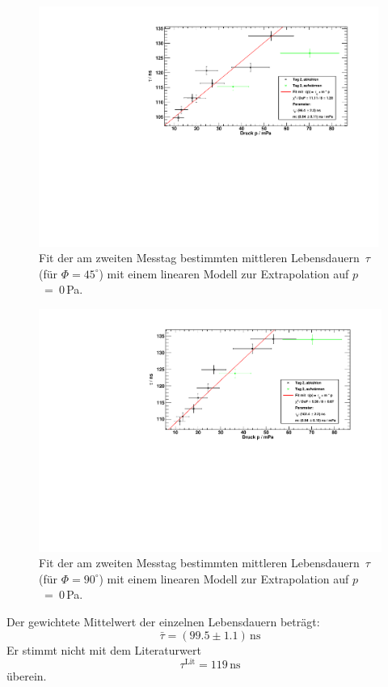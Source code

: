 \begin{figure}[H]
\begin{center}
  \includegraphics[width=0.99\textwidth]{../img/taus_45_day2.pdf}
  \caption{Fit der am zweiten Messtag bestimmten mittleren Lebensdauern~$\tau$ (für $\Phi=45^\circ$) mit einem linearen Modell
  zur Extrapolation auf \mbox{$p$ = 0\,Pa}.}
  \label{img:taus:day2:45}
\end{center}
\end{figure}

\begin{figure}[H]
\begin{center}
  \includegraphics[width=\textwidth]{../img/taus_90_day2.pdf}
  \caption{Fit der am zweiten Messtag bestimmten mittleren Lebensdauern~$\tau$ (für $\Phi=90^\circ$) mit einem linearen Modell
  zur Extrapolation auf \mbox{$p$ = 0\,Pa}.}
  \label{img:taus:day2:90}
\end{center}
\end{figure}


Der gewichtete Mittelwert der einzelnen Lebensdauern beträgt:
\begin{equation}
  \bar{\tau} = (99.5 \pm 1.1)\,\text{ns}
\end{equation}
Er stimmt nicht mit dem Literaturwert \cite{manual} 
\begin{equation}
  \tau^{\text{Lit}} = 119\,\text{ns}
\end{equation}
überein.
